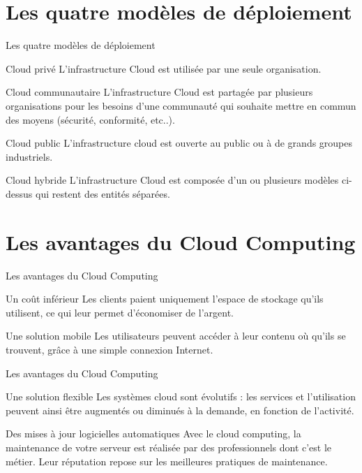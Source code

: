 \documentclass{beamer}
\begin{document}
\section{Les quatre modèles de déploiement}
\begin{frame}{Les quatre modèles de déploiement}
  \begin{block}{Cloud privé}
  L’infrastructure Cloud est utilisée par une seule organisation.
  \end{block} 
  \pause
  \begin{block}{Cloud communautaire}
  L’infrastructure Cloud est partagée par plusieurs organisations pour les besoins d’une communauté qui souhaite mettre en commun des moyens (sécurité, conformité, etc..).
  \end{block} 
  \pause
  \begin{block}{Cloud public}
  L’infrastructure cloud est ouverte au public ou à de grands groupes industriels.
  \end{block} 
  \pause
  \begin{block}{Cloud hybride}
  L’infrastructure Cloud est composée d’un ou plusieurs modèles  ci-dessus qui restent des entités séparées.
  \end{block} 
\end{frame}


\section{Les avantages du Cloud Computing}
\begin{frame}{Les avantages du Cloud Computing}
\begin{block}{Un coût inférieur}
Les clients paient uniquement l'espace de stockage qu'ils utilisent, ce qui leur permet d'économiser de l'argent.
\end{block}
\pause
\begin{block}{Une solution mobile}
Les utilisateurs peuvent accéder à leur contenu où qu'ils se trouvent, grâce à une simple connexion Internet.
\end{block}
\end{frame}

\begin{frame}{Les avantages du Cloud Computing}
\begin{block}{Une solution flexible}
Les systèmes cloud sont évolutifs : les services et l'utilisation peuvent ainsi être augmentés ou diminués à la demande, en fonction de l'activité.
\end{block}
\pause
\begin{block}{Des mises à jour logicielles automatiques}
Avec le cloud computing, la maintenance de votre serveur est réalisée par des professionnels dont c'est le métier. Leur réputation repose sur les meilleures pratiques de maintenance.
\end{block}
\end{frame}
\end{document}
